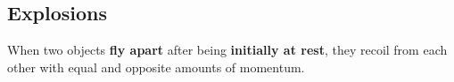 \subsection{Explosions}

When two objects \textbf{fly apart} after being \textbf{initially at rest}, they recoil from each other with equal and opposite amounts of momentum.
